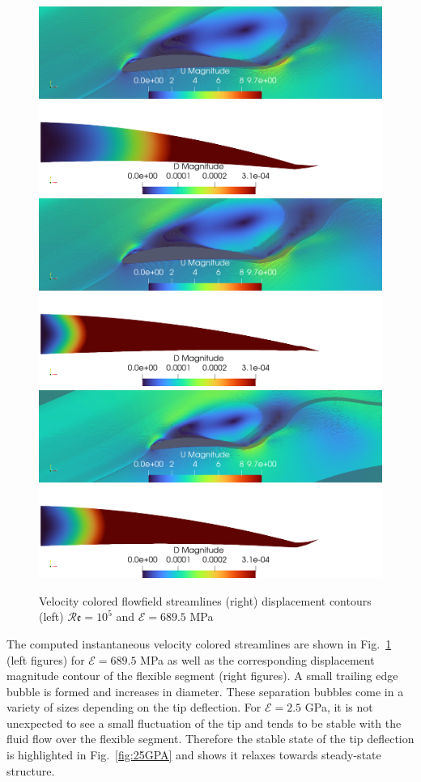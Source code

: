\documentclass[conf]{new-aiaa}
\newcommand{\Rey}{\mathcal{R}\mathfrak{e}}
\begin{document}
\begin{figure}[hbt!]
\includegraphics[width=0.45\columnwidth]{Figures/streamLines0988Coupling.png}
\includegraphics[width=0.45\columnwidth]{Figures/DMAgnitude0988Coupling.png}
\includegraphics[width=0.45\columnwidth]{Figures/streamLines0992Coupling.png}
\includegraphics[width=0.45\columnwidth]{Figures/DMAgnitude0992Coupling.png}
\includegraphics[width=0.45\columnwidth]{Figures/streamLines0998Coupling.png}
\includegraphics[width=0.45\columnwidth]{Figures/DMAgnitude0998Coupling.png}
\caption{Velocity colored flowfield streamlines (right) displacement contours (left) $\Rey=10^5$ and $\mathcal{E}=689.5$ MPa}
\label{fig:velocityDisplacement} 
\end{figure}
%
The computed instantaneous velocity colored streamlines are shown in Fig.~\ref{fig:velocityDisplacement} (left figures) for $\mathcal{E}= 689.5$ MPa  as well as the corresponding displacement magnitude contour of the flexible segment (right figures).
%
A small trailing edge bubble is formed and increases in diameter.
%
These separation bubbles come in a variety of sizes depending on the tip deflection.
%
For $\mathcal{E}=2.5$ GPa, it is not unexpected to see a small fluctuation of the tip and tends to be stable with the fluid flow over the flexible segment. Therefore the stable state of the tip deflection is highlighted in Fig.~\ref{fig:25GPA} and shows it relaxes towards steady-state structure.
\end{document}
